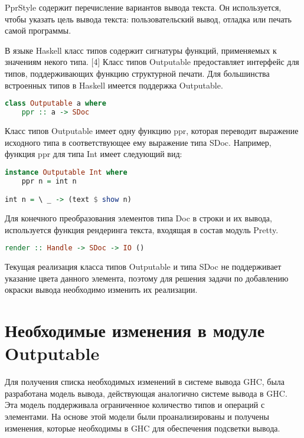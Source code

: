 PprStyle содержит перечисление вариантов вывода текста. Он используется, чтобы указать цель вывода текста: пользовательский вывод, отладка или печать самой программы.

В языке Haskell класс типов содержит сигнатуры функций, применяемых к значениям некого типа. [4] Класс типов Outputable предоставляет интерфейс для типов, поддерживающих функцию структурной печати. Для большинства встроенных типов в Haskell имеется поддержка Outputable.

\begin{lstlisting}[language=Haskell]
class Outputable a where
	ppr :: a -> SDoc
\end{lstlisting}

Класс типов Outputable имеет одну функцию ppr, которая переводит выражение исходного типа в соответствующее ему выражение типа SDoc. Например, функция ppr для типа Int имеет следующий вид:

\begin{lstlisting}[language=Haskell]
instance Outputable Int where
    ppr n = int n

int n = \ _ -> (text $ show n)

\end{lstlisting}

Для конечного преобразования элементов типа Doc в строки и их вывода, используется функция рендеринга текста, входящая в состав модуль Pretty.

\begin{lstlisting}[language=Haskell, caption=Типовая аннотация к функции рендеринга текста]
render :: Handle -> SDoc -> IO ()
\end{lstlisting}

Текущая реализация класса типов Outputable и типа SDoc не поддерживает указание цвета данного элемента, поэтому для решения задачи по добавлению окраски вывода необходимо изменить их реализации.

\section{Необходимые изменения в модуле Outputable}

Для получения списка необходимых изменений в системе вывода GHC, была разработана модель вывода, действующая аналогично системе вывода в GHC. Эта модель поддерживала ограниченное количество типов и операций с элементами. На основе этой модели были проанализированы и получены изменения, которые необходимы в GHC для обеспечения подсветки вывода.

